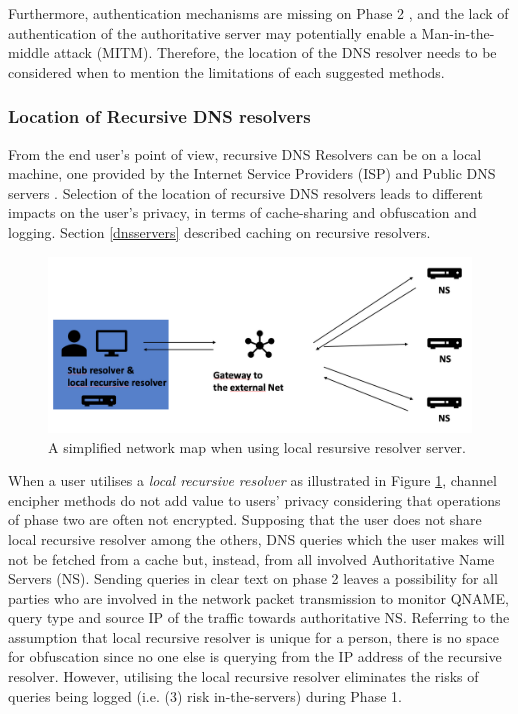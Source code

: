 Furthermore, authentication mechanisms are missing on Phase 2 \cite{I-D.bortzmeyer-dprive-step-2}, and the lack of authentication of the authoritative server may potentially enable a Man-in-the-middle attack (MITM).
Therefore, the location of the DNS resolver needs to be considered when to mention the limitations of each suggested methods.

\subsubsection{Location of Recursive DNS resolvers}
From the end user's point of view, recursive DNS Resolvers can be on a local machine, one provided by the Internet Service Providers (ISP) and Public DNS servers \cite{van2018privacy}.
Selection of the location of recursive DNS resolvers leads to different impacts on the user's privacy, in terms of cache-sharing\cite{van2018privacy, wang2013analysis} and obfuscation and logging. Section \ref{dnsservers} described caching on recursive resolvers.

\begin{figure}[ht!]
    \begin{center}
    \includegraphics*[width=0.9\columnwidth]{img/local-recursive}
    \end{center}
    \caption{A simplified network map when using local resursive resolver server.}
    \label{localrecursive}
\end{figure}
When a user utilises a \textit{local recursive resolver} as illustrated in Figure \ref{localrecursive}, channel encipher methods do not add value to users' privacy considering that operations of phase two are often not encrypted.
Supposing that the user does not share local recursive resolver among the others, DNS queries which the user makes will not be fetched from a cache but, instead, from all involved Authoritative Name Servers (NS).
Sending queries in clear text on phase 2 leaves a possibility for all parties who are involved in the network packet transmission to monitor QNAME, query type and source IP of the traffic towards authoritative NS.
Referring to the assumption that local recursive resolver is unique for a person, there is no space for obfuscation since no one else is querying from the IP address of the recursive resolver.
However, utilising the local recursive resolver eliminates the risks of queries being logged (i.e. (3) risk in-the-servers) during Phase 1.


